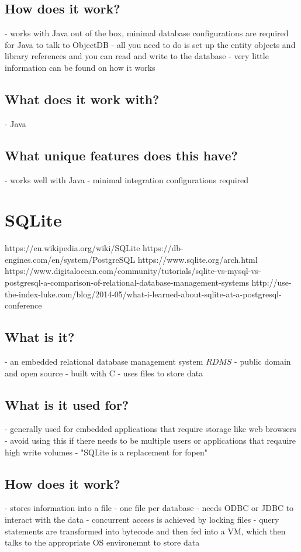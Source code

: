 \section{How does it work?}
- works with Java out of the box, minimal database configurations are required for Java to talk to ObjectDB
- all you need to do is set up the entity objects and library references and you can read and write to the database
- very little information can be found on how it works

\section{What does it work with?}
- Java

\section{What unique features does this have?}
- works well with Java
- minimal integration configurations required

\chapter{SQLite}
https://en.wikipedia.org/wiki/SQLite
https://db-engines.com/en/system/PostgreSQL%
https://www.sqlite.org/arch.html
https://www.digitalocean.com/community/tutorials/sqlite-vs-mysql-vs-postgresql-a-comparison-of-relational-database-management-systems
http://use-the-index-luke.com/blog/2014-05/what-i-learned-about-sqlite-at-a-postgresql-conference

\section{What is it?}
- an embedded relational database management system \(RDMS\)
- public domain and open source
- built with C
- uses files to store data

\section{What is it used for?}
- generally used for embedded applications that require storage like web browsers
- avoid using this if there needs to be multiple users or applications that reqauire high write volumes
- "SQLite is a replacement for fopen"

\section{How does it work?}
- stores information into a file - one file per database
- needs ODBC or JDBC to interact with the data
- concurrent access is achieved by locking files
- query statements are transformed into bytecode and then fed into a VM, which then talks to the appropriate OS environemnt to store data

